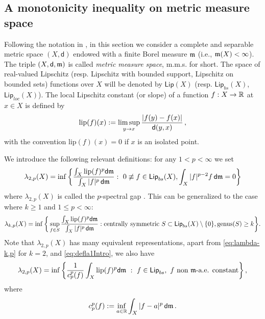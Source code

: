 \documentclass[12pt,a4paper]{article}
\begin{document}

\subsection{A monotonicity inequality on metric measure space}

Following the notation in \cite{DePonti21b}, in this section we consider a complete and separable metric space $(X, \mathsf{d})$ endowed with a finite Borel measure $\mathfrak m$ (i.e., $\mathfrak m(X)<\infty$). The triple $(X, \mathsf{d}, \mathfrak m)$ is called \emph{metric measure space}, m.m.s. for short.
The space of real-valued Lipschitz (resp.  %
Lipschitz with bounded support, Lipschitz on bounded sets) functions over $X$ will be denoted by $\mathsf{Lip}(X)$ (resp. %
$\mathsf{Lip}_{bs}(X)$, $\mathsf{Lip}_{loc}(X)$). The local Lipschitz constant (or slope) of a function $f:X\rightarrow \mathbb{R}$ at $x\in X$ is defined by
\begin{equation*}
\mathrm{lip}(f)(x):=\limsup_{y\rightarrow x} \frac{|f(y)-f(x)|}{\mathsf{d}(y,x)}\, ,
\end{equation*}  
with the convention $\mathrm{lip}(f)(x)=0$ if $x$ is an isolated point.

We introduce the following relevant definitions:  for any $1<p<\infty$ we set
\begin{equation}\label{eq:defla1Intro}
\lambda_{2,p}(X)= \inf\bigg\{\frac{\int_X \mathrm{lip}(f)^p \mathsf{d}\mathfrak m}{\int_X |f|^p\,\mathsf{d}\mathfrak m}: \ 0\not\equiv f\in \mathsf{Lip}_{bs}(X), \int_X |f|^{p-2}f\, \mathsf{d}\mathfrak m=0\bigg\}
\end{equation} 
where $\lambda_{2,p}(X)$ is called the $p$-spectral gap \cite{Cavalletti}. 
This can be generalized to the case where $k\ge 1$ and $1\le p<\infty$:
\begin{equation}\label{eq:lambda-k,p}
\lambda_{k,p}(X)= \inf\bigg\{\sup_{f\in S}\frac{\int_X \mathrm{lip}(f)^p \mathsf{d}\mathfrak m}{\int_X |f|^p\,\mathsf{d}\mathfrak m}:  \text{centrally symmetric }S\subset \mathsf{Lip}_{bs}(X)\setminus\{0\}, \mathrm{genus}(S)\ge k\bigg\}.    
\end{equation}
Note that $\lambda_{2,p}(X)$ has many equivalent representations, apart from \eqref{eq:lambda-k,p} for $k=2$, and \eqref{eq:defla1Intro}, we also have
\begin{equation*}
\lambda_{2,p}(X)=\inf\left\{\frac{1}{c_p^p(f)}\int_X \mathrm{lip}(f)^p\mathsf{d}\mathfrak m \ : \ f\in \mathsf{Lip}_{bs}, \ f \ \textrm{non $\mathfrak m$-a.e. constant} \right\},
\end{equation*}
where 
$$c^p_p(f):=\inf_{a\in \mathbb{R}}\int_X |f-a|^p\,\mathsf{d}\mathfrak m\, .$$
\end{document}
